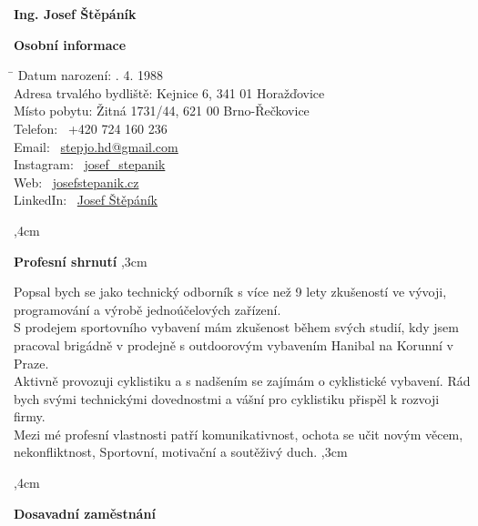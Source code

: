 \documentclass[10pt]{article}
\begin{document}
\begin{center}
\textbf{\LARGE Ing. Josef Štěpáník} \\
\end{center}

\textbf{Osobní informace} 

\begin{tabbing}
    \hspace{6cm}\= \kill
    Datum narození: . 4. 1988 \\
    Adresa trvalého bydliště: \> Kejnice 6, 341 01 Horažďovice \\
    Místo pobytu: \> Žitná 1731/44, 621 00 Brno-Řečkovice \\
    Telefon: \> \faPhone \ +420 724 160 236 \\
    Email: \> \faEnvelope \ \href{mailto:stepjo.hd@gmail.com}{stepjo.hd@gmail.com} \\
    Instagram: \>  \faInstagram \ \href{https://www.instagram.com/josef_stepanik/}{josef\_stepanik} \\
    Web: \>  \faGlobe \ \href{https://www.josefstepanik.cz/}{josefstepanik.cz} \\
    LinkedIn: \>  \faLinkedin \ \href{https://www.linkedin.com/in/josef-štěpáník-30106174/}{Josef Štěpáník}
\end{tabbing}

\noindent\hrulefill
{},4cm

\textbf{Profesní shrnutí}
,3cm

\indent Popsal bych se jako technický odborník s více než 9 lety zkušeností ve vývoji, programování a výrobě jednoúčelových zařízení. \\
\indent S prodejem sportovního vybavení mám zkušenost během svých studií, kdy jsem pracoval brigádně v prodejně s outdoorovým vybavením Hanibal na Korunní v Praze. \\
\indent Aktivně provozuji cyklistiku a s nadšením se zajímám o cyklistické vybavení. Rád bych svými technickými dovednostmi a vášní pro cyklistiku přispěl k rozvoji firmy. \\
\indent Mezi mé profesní vlastnosti patří komunikativnost, ochota se učit novým věcem, nekonfliktnost, Sportovní, motivační a soutěživý duch.
,3cm

\noindent\hrulefill
{},4cm

\textbf{Dosavadní zaměstnání}
\end{document}
